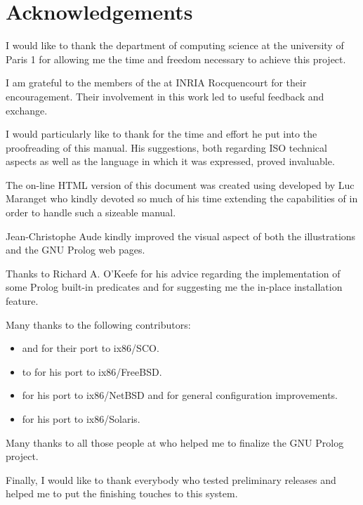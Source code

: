 \newpage
\section*{Acknowledgements}

I would like to thank the 
{department of computing science} at the university of Paris 1 for allowing
me the time and freedom necessary to achieve this project.

I am grateful to the members of the  at 
{INRIA Rocquencourt} for their encouragement. Their involvement in this work
led to useful feedback and exchange.

I would particularly like to thank
 for the time and
effort he put into the proofreading of this manual. His suggestions, both
regarding ISO technical aspects as well as the language in which it was
expressed, proved invaluable.

The on-line HTML version of this document was created using
 developed by Luc Maranget who kindly devoted so much
of his time extending the capabilities of {\hevea} in order to handle such a
sizeable manual.

Jean-Christophe Aude kindly improved the visual aspect of both the
illustrations and the GNU Prolog web pages.

Thanks to Richard A. O'Keefe for his advice regarding the implementation of
some Prolog built-in predicates and for suggesting me the in-place
installation feature.

Many thanks to the following contributors:

\begin{itemize}

\item {} and
 for their port to 
ix86/SCO.

\item {} to for his port to
ix86/FreeBSD.

\item {} for his port to
ix86/NetBSD and for general configuration improvements.

\item {} for
his port to ix86/Solaris.

\end{itemize}

Many thanks to all those people at  who helped
me to finalize the GNU Prolog project.

Finally, I would like to thank everybody who tested preliminary releases and
helped me to put the finishing touches to this system.

